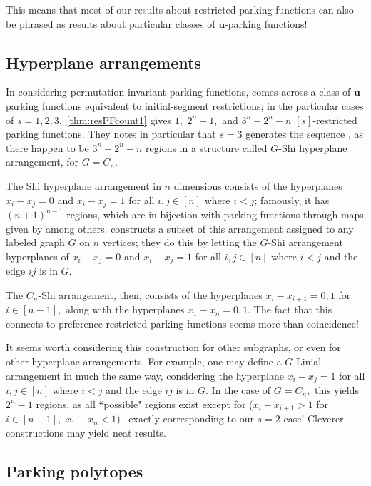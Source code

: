 \documentclass[12 pt]{amsart}
\theoremstyle{definition} %
\theoremstyle{remark} %
\begin{document}
This means that most of our results about restricted parking functions can also be phrased as results about particular classes of $\mathbf{u}$-parking functions!

\subsection{Hyperplane arrangements}

In considering permutation-invariant parking functions, \cite{chen-2023} comes across a class of $\mathbf{u}$-parking functions equivalent to initial-segment restrictions; in the particular cases of $s=1,2,3,$ \cref{thm:resPFcount1} gives $1,$ $2^n-1,$ and $3^n-2^n-n$ $[s]$-restricted parking functions. They notes in particular that $s=3$ generates the sequence \cite[A001263]{oeis}, as there happen to be $3^n-2^n-n$ regions in a structure called $G$-Shi hyperplane arrangement, for $G=C_n.$

The Shi hyperplane arrangement in $n$ dimensions consists of the hyperplanes $x_i-x_j=0$ and $x_i-x_j=1$ for all $i,j\in[n]$ where $i<j$; famously, it has $(n+1)^{n-1}$ regions, which are in bijection with parking functions through maps given by \cite{athanasiadis-linusson-1999} among others. \cite{bennett-2024} constructs a subset of this arrangement assigned to any labeled graph $G$ on $n$ vertices; they do this by letting the $G$-Shi arrangement hyperplanes of $x_i-x_j=0$ and $x_i-x_j=1$ for all $i,j\in[n]$ where $i<j$ and the edge $ij$ is in $G.$

The $C_n$-Shi arrangement, then, consists of the hyperplanes $x_i-x_{i+1}=0,1$ for $i\in[n-1],$ along with the hyperplanes $x_1-x_n=0,1.$ The fact that this connects to preference-restricted parking functions seems more than coincidence!

It seems worth considering this construction for other subgraphs, or even for other hyperplane arrangements. For example, one may define a $G$-Linial arrangement in much the same way, considering the hyperplane $x_i-x_j=1$ for all $i,j\in[n]$ where $i<j$ and the edge $ij$ is in $G.$ In the case of $G=C_n,$ this yields $2^n-1$ regions, as all ``possible" regions exist except for ($x_i-x_{i+1}>1$ for $i\in[n-1],$ $x_1-x_n<1$)-- exactly corresponding to our $s=2$ case! Cleverer constructions may yield neat results.

\subsection{Parking polytopes}



\end{document}
